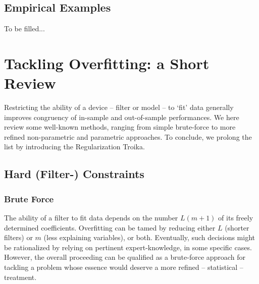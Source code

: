 \documentclass[a4paper]{book}
\begin{document}
\subsection{Empirical Examples}

To be filled... %




\section{Tackling Overfitting: a Short Review}\label{ta_ov_s_r}


Restricting the ability of a device -- filter or model -- to `fit' data generally improves congruency of in-sample and out-of-sample performances. We here review some well-known methods, ranging from simple brute-force to more refined non-parametric and parametric approaches. To conclude, we prolong the list by introducing the Regularization Troika.



\subsection{Hard (Filter-) Constraints}


\subsubsection{Brute Force }

The ability of a filter to fit data depends on the number $L(m+1)$ of its freely determined coefficients. Overfitting can be tamed by reducing either $L$ (shorter filters) or $m$ (less explaining variables), or both. Eventually, such decisions might be rationalized by relying on pertinent expert-knowledge, in some specific cases. However, the overall proceeding can be qualified as a brute-force approach for tackling a problem whose essence would deserve a more refined -- statistical -- treatment.
\end{document}
